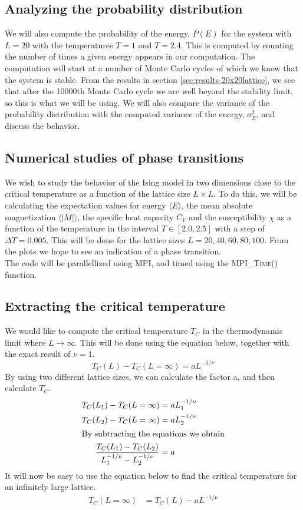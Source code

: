 \documentclass[../main.tex]{subfiles}
\begin{document}
\subsection{Analyzing the probability distribution}
We will also compute the probability of the energy, $P(E)$ for the system with $L = 20$ with the temperatures $T= 1$ and $T= 2.4$. This is computed by counting the number of times a given energy appears in our computation. The computation will start at a number of Monte Carlo cycles of which we know that the system is stable. From the results in section \ref{sec:results-20x20lattice}, we see that after the 10000th Monte Carlo cycle we are well beyond the stability limit, so this is what we will be using. We will also compare the variance of the probability distribution with the computed variance of the energy, $\sigma_E^2$, and discuss the behavior.

\subsection{Numerical studies of phase transitions}
We wish to study the behavior of the Ising model in two dimensions close to the critical temperature as a function of the lattice size $L \times L$.  To do this, we will be calculating the expectation values for energy $\langle E \rangle$, the mean absolute magnetization $\langle |M| \rangle$, the specific heat capacity $C_V$ and the susceptibility $\chi$ as a function of the temperature in the interval $ T \in [2.0,2.5]$ with a step of $\Delta T = 0.005$. This will be done for the lattice sizes $L = {20, 40, 60, 80, 100}$. From the plots we hope to see an indication of a phase transition.\\
The code will be parallellized using MPI, and timed using the \textsc{MPI\_Time()} function.

\subsection{Extracting the critical temperature} \label{sec:theory-extractingTC}
We would like to compute the critical temperature $T_C$ in the thermodynamic limit where $L \rightarrow \infty$. This will be done using the equation below, together with the exact result of $\nu = 1$.
\[T_C(L) - T_C(L = \infty) = aL^{-1/\nu}\]
By using two different lattice sizes, we can calculate the factor a, and then calculate  $T_C$.
\begin{align}
  T_C(L_1) - T_C(L = \infty) &= aL_1^{-1/\nu} \nonumber\\
  T_C(L_2) - T_C(L = \infty) &= aL_2^{-1/\nu} \nonumber\\
  \intertext{By subtracting the equations we obtain}
  \frac{T_C(L_1) - T_C(L_2)}{L_1^{-1/\nu} - L_2^{-1/\nu}} &= a \label{eq:a}
\end{align}
It will now be easy to use the equation below to find the critical temperature for an infinitely large lattice.
\begin{align}
T_C(L = \infty) &= T_C(L) - aL^{-1/\nu} \label{eq:TC}
\end{align}
\end{document}
